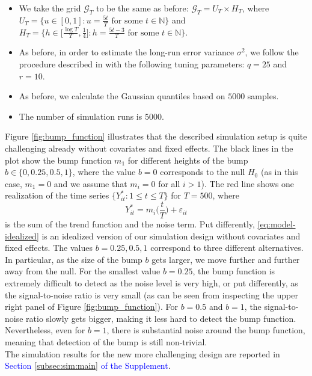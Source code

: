 \documentclass[a4paper,12pt]{article}
\begin{document}
\begin{enumerate}[label=\arabic*.,leftmargin=0.6cm]
\begin{enumerate}[label=(\roman*),leftmargin=0.75cm,topsep=0pt]
\begin{itemize}[leftmargin=0.45cm,itemsep=0pt,topsep=0pt]
\item We take the grid $\mathcal{G}_T$ to be the same as before: $\mathcal{G}_T = U_T \times H_T$, where $U_T = \big\{ u \in [0,1]: u = \textstyle{\frac{5t}{T}} \text{ for some } t \in \mathbb{N} \big\}$ and $H_T = \big\{ h \in \big[ \textstyle{\frac{\log T}{T}}, \textstyle{\frac{1}{4}} \big]:  h = \textstyle{\frac{5t - 3}{T}} \text{ for some } t \in \mathbb{N} \big\}$.

\item As before, in order to estimate the long-run error variance $\sigma^2$, we follow the procedure described in \citet{KhismatullinaVogt2020} with the following tuning parameters: $q = 25$ and $r = 10$.

\item As before, we calculate the Gaussian quantiles based on $5000$ samples. 

\item The number of simulation runs is $5000$. 

\end{itemize}

Figure \ref{fig:bump_function} illustrates that the described simulation setup is quite challenging already without covariates and fixed effects. The black lines in the plot show the bump function $m_1$ for different heights of the bump $b \in \{0, 0.25, 0.5, 1\}$, where the value $b=0$ corresponds to the null $H_0$ (as in this case, $m_1 = 0$ and we assume that $m_i = 0$ for all $i > 1$). The red line shows one realization of the time series $\{Y_{it}^*:1 \le t \le T \}$ for $T=500$, where 
\begin{equation}\label{eq:model-idealized}
Y_{it}^* = m_i\Big(\frac{t}{T}\Big) + \varepsilon_{it} 
\end{equation}
is the sum of the trend function and the noise term. Put differently, \eqref{eq:model-idealized} is an idealized version of our simulation design without covariates and fixed effects. The values $b=0.25,0.5,1$ correspond to three different alternatives. In particular, as the size of the bump $b$ gets larger, we move further and further away from the null. For the smallest value $b=0.25$, the bump function is extremely difficult to detect as the noise level is very high, or put differently, as the signal-to-noise ratio is very small (as can be seen from inspecting the upper right panel of Figure \ref{fig:bump_function}). For $b=0.5$ and $b=1$, the signal-to-noise ratio slowly gets bigger, making it less hard to detect the bump function. Nevertheless, even for $b=1$, there is substantial noise around the bump function, meaning that detection of the bump is still non-trivial. \\
The simulation results for the new more challenging design are reported in \textcolor{blue}{Section \ref{subsec:sim:main} of the Supplement}. 


\end{enumerate}
\end{enumerate}
\end{document}
